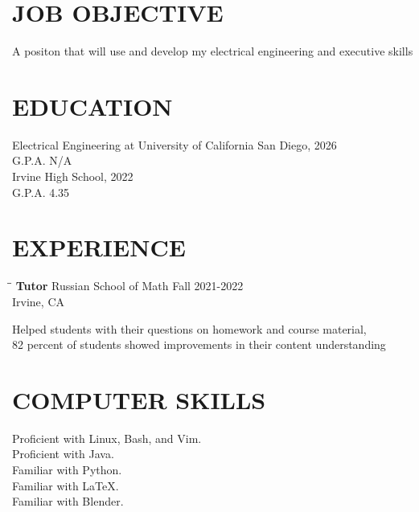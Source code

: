 \documentclass[25pt]{res}
\begin{document}
 


\address{\bf  PRESENT ADDRESS\\1 Indiana\\Irvine, California 92606\\mbazzani@ucsd.edu\\(949)-838-5721}

\begin{resume}

\section{JOB OBJECTIVE}          
    A positon that will use and develop my electrical engineering and executive skills
\section{EDUCATION}          
    Electrical Engineering at University of California San Diego, 2026  \\
    G.P.A. N/A \\
    Irvine High School, 2022  \\
    G.P.A. 4.35

 
\section{EXPERIENCE}
   \vspace{-0.1in}	
   \begin{tabbing}
   \hspace{2.3in}\= \hspace{2.6in}\= \kill %
    {\bf Tutor} \>Russian School of Math     \>Fall 2021-2022\\
                             \>Irvine, CA
   \end{tabbing}\vspace{-15pt}      %
   Helped students with their questions on homework and course material, \\
   82 percent of students showed improvements in their content understanding


\section{COMPUTER SKILLS}          
    Proficient with Linux, Bash, and Vim. \\
    Proficient with Java. \\
    Familiar with Python. \\
    Familiar with LaTeX. \\
    Familiar with Blender.


\end{resume}
\end{document}
